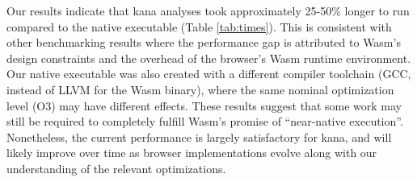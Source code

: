\documentclass{article}
\begin{document}
\begin{table}
\caption{Collection of scRNA-seq datasets used for testing.}
\label{tab:datasets}
\begin{center}
\end{center}
\end{table}

Our results indicate that kana analyses took approximately 25-50\% longer to run compared to the native executable (Table \ref{tab:times}).
This is consistent with other benchmarking results \cite{jangda2019not}
where the performance gap is attributed to Wasm's design constraints and the overhead of the browser's Wasm runtime environment.
Our native executable was also created with a different compiler toolchain (GCC, instead of LLVM for the Wasm binary),
where the same nominal optimization level (O3) may have different effects.
These results suggest that some work may still be required to completely fulfill Wasm's promise of ``near-native execution''.
Nonetheless, the current performance is largely satisfactory for kana,
and will likely improve over time as browser implementations evolve along with our understanding of the relevant optimizations.
\end{document}
